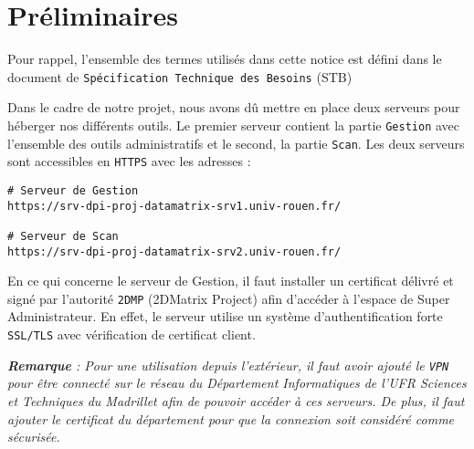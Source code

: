 \section{Préliminaires}
Pour rappel, l'ensemble des termes utilisés dans cette notice est défini dans le document de \texttt{Spécification Technique des Besoins} (STB)

Dans le cadre de notre projet, nous avons dû mettre en place deux serveurs pour héberger nos différents outils. Le premier serveur contient la partie \texttt{Gestion} avec l'ensemble des outils administratifs et le second, la partie \texttt{Scan}.
Les deux serveurs sont accessibles en \texttt{HTTPS} avec les adresses :
\begin{verbatim}
# Serveur de Gestion
https://srv-dpi-proj-datamatrix-srv1.univ-rouen.fr/

# Serveur de Scan
https://srv-dpi-proj-datamatrix-srv2.univ-rouen.fr/
\end{verbatim} 
\vspace{1cm}

En ce qui concerne le serveur de Gestion, il faut installer un certificat délivré et signé par l'autorité \texttt{2DMP} (2DMatrix Project) afin d'accéder à l'espace de Super Administrateur. En effet, le serveur utilise un système d'authentification forte \texttt{SSL/TLS} avec vérification de certificat client.

\small\textit{\textbf{Remarque} : Pour une utilisation depuis l'extérieur, il faut avoir ajouté le \texttt{VPN} pour être connecté sur le réseau du Département Informatiques de l'UFR Sciences et Techniques du Madrillet afin de pouvoir accéder à ces serveurs. De plus, il faut ajouter le certificat du département pour que la connexion soit considéré comme sécurisée.}